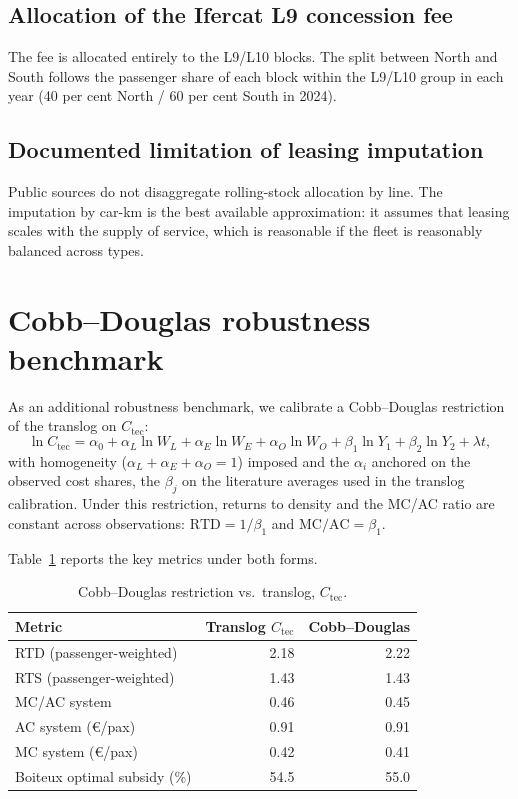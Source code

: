 \documentclass[11pt,a4paper]{article}
\begin{document}
\subsection{Allocation of the Ifercat L9 concession fee}
The fee is allocated entirely to the L9/L10 blocks. The split between
North and South follows the passenger share of each block within the
L9/L10 group in each year (40 per cent North / 60 per cent South in
2024).

\subsection{Documented limitation of leasing imputation}
Public sources do not disaggregate rolling-stock allocation by line. The
imputation by car-km is the best available approximation: it assumes
that leasing scales with the supply of service, which is reasonable if
the fleet is reasonably balanced across types.

\section{Cobb--Douglas robustness benchmark}
\label{app:cobb}

As an additional robustness benchmark, we calibrate a Cobb--Douglas
restriction of the translog on $C_{\text{tec}}$:
\begin{equation}
\ln C_{\text{tec}} = \alpha_0 + \alpha_L \ln W_L + \alpha_E \ln W_E
+ \alpha_O \ln W_O + \beta_1 \ln Y_1 + \beta_2 \ln Y_2 + \lambda t,
\end{equation}
with homogeneity ($\alpha_L + \alpha_E + \alpha_O = 1$) imposed and the
$\alpha_i$ anchored on the observed cost shares, the $\beta_j$ on the
literature averages used in the translog calibration. Under this
restriction, returns to density and the MC/AC ratio are constant across
observations: $\text{RTD} = 1/\beta_1$ and $\text{MC}/\text{AC} = \beta_1$.

Table~\ref{tab:cobb} reports the key metrics under both forms.

\begin{table}[H]
\centering
\caption{Cobb--Douglas restriction vs.\ translog, $C_{\text{tec}}$.}
\label{tab:cobb}
\footnotesize
\begin{tabular}{lrr}
\toprule
Metric & Translog $C_{\text{tec}}$ & Cobb--Douglas \\
\midrule
RTD (passenger-weighted)        & 2.18 & 2.22 \\
RTS (passenger-weighted)        & 1.43 & 1.43 \\
MC/AC system                    & 0.46 & 0.45 \\
AC system (\euro{}/pax)         & 0.91 & 0.91 \\
MC system (\euro{}/pax)         & 0.42 & 0.41 \\
Boiteux optimal subsidy (\%)    & 54.5 & 55.0 \\
\bottomrule
\end{tabular}
\end{table}
\end{document}

